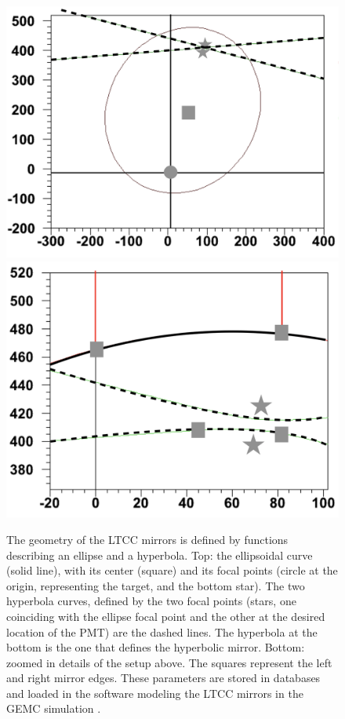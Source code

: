 \begin{figure}
	\centering
	\includegraphics[width=0.98\columnwidth,keepaspectratio]{img/mirrorMath1.png}
	\includegraphics[width=0.98\columnwidth,keepaspectratio]{img/mirrorMath2.png}
	\caption{The geometry of the LTCC mirrors is defined by functions describing an ellipse and a hyperbola.
             Top: the ellipsoidal curve (solid line), with its center (square) and its focal points
             (circle at the origin, representing the target, and the bottom star).
             The two hyperbola curves, defined by the two focal points (stars, one coinciding with the ellipse
			 focal point and the other at the desired location of the PMT) are the dashed lines. The
			 hyperbola at the bottom is the one that defines the hyperbolic mirror.
             Bottom: zoomed in details of the setup above. The squares represent the left and right mirror edges.
             These parameters are stored in databases and loaded in the software modeling the LTCC mirrors
             in the GEMC simulation \cite{sim-nim}.}
	\label{fig:mirrorMath}
\end{figure}



